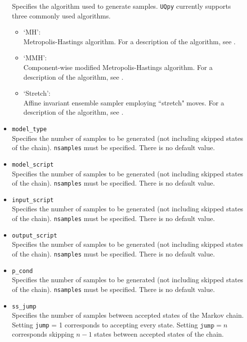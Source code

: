 \documentclass[./UsersGuide.tex]{subfiles}
\begin{document}
\begin{itemize}
	Specifies the algorithm used to generate samples. \texttt{UQpy} currently supports three commonly used algorithms.
	\begin{itemize}
		\item `MH': \\ 
			Metropolis-Hastings algorithm. For a description of the algorithm, see \cite{Metropolis1953,Hastings1970,Au2001}. 
		\item `MMH': \\ 
			Component-wise modified Metropolis-Hastings algorithm. For a description of the algorithm, see \cite{Au2001}. 
		\item `Stretch': \\ 
			Affine invariant ensemble sampler employing ``stretch" moves. For a description of the algorithm, see \cite{Goodman2010}.
	\end{itemize} 
\item \texttt{model\_type}\\
	Specifies the number of samples to be generated (not including skipped states of the chain). \texttt{nsamples} must be specified. There is no default value.
\item \texttt{model\_script}\\
	Specifies the number of samples to be generated (not including skipped states of the chain). \texttt{nsamples} must be specified. There is no default value.
\item \texttt{input\_script}\\
	Specifies the number of samples to be generated (not including skipped states of the chain). \texttt{nsamples} must be specified. There is no default value.
\item \texttt{output\_script}\\
	Specifies the number of samples to be generated (not including skipped states of the chain). \texttt{nsamples} must be specified. There is no default value.
\item \texttt{p\_cond}\\
	Specifies the number of samples to be generated (not including skipped states of the chain). \texttt{nsamples} must be specified. There is no default value.
\item \texttt{ss\_jump}\\
	Specifies the number of samples between accepted states of the Markov chain. Setting \texttt{jump} = 1 corresponds to accepting every state. Setting $\texttt{jump} = n$ corresponds 	skipping $n-1$ states between accepted states of the chain.
\end{itemize}
\end{document}
